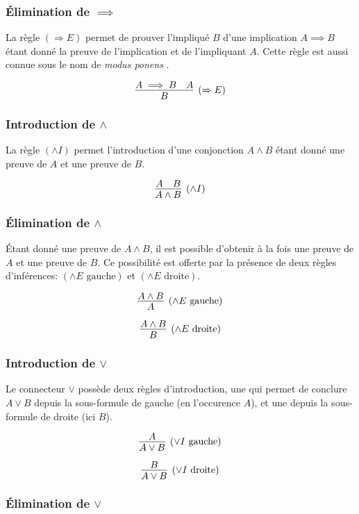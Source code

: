 \subsubsection{Élimination de $\implies$}

La règle $({\Rightarrow{}}E)$ permet de prouver l'impliqué $B$ d'une implication $A \implies B$ étant donné la preuve de l'implication et de l'impliquant $A$. Cette règle est aussi connue sous le nom de \og \textit{modus ponens} \fg{}.

\[
\infer[({\Rightarrow{}}E)]{B}{A \implies B & A}
\]

\subsubsection{Introduction de $\wedge$}

La règle $({\wedge}I)$ permet l'introduction d'une conjonction $A \wedge B$ étant donné une preuve de $A$ et une preuve de $B$.

\[
\infer[({\wedge{}}I)]{A \wedge B}{A & B}
\]

\subsubsection{Élimination de $\wedge$}

Étant donné une preuve de $A \wedge B$, il est possible d'obtenir à la fois une preuve de $A$ et une preuve de $B$.
Ce possibilité est offerte par la présence de deux règles d'inférences: $({\wedge{}}E\text{ gauche})$ et $({\wedge{}}E\text{ droite})$.

\[
\infer[({\wedge{}}E\text{ gauche})]{A}{A \wedge B}
\]

\[
\infer[({\wedge{}}E\text{ droite})]{B}{A \wedge B}
\]

\subsubsection{Introduction de $\vee$}

Le connecteur ${\vee}$ possède deux règles d'introduction, une qui permet de conclure $A \vee B$ depuis la sous-formule de gauche (en l'occurence $A$), et une depuis la sous-formule de droite (ici $B$).

\[
\infer[({\vee}I\text{ gauche})]{A \vee B}{A}
\]

\[
\infer[({\vee}I\text{ droite})]{A \vee B}{B}
\]

\subsubsection{Élimination de $\vee$}

